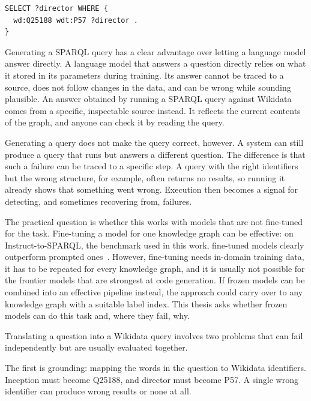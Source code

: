 \begin{lstlisting}[language=SPARQL,caption={A SPARQL query for ``Who directed Inception?''. It returns wd:Q25191 (Christopher Nolan).},label={lst:example-query},captionpos=b]
SELECT ?director WHERE {
  wd:Q25188 wdt:P57 ?director .
}
\end{lstlisting}

Generating a SPARQL query has a clear advantage over letting a language model answer directly.
A language model that answers a question directly relies on what it stored in its parameters during training.
Its answer cannot be traced to a source, does not follow changes in the data, and can be wrong while sounding plausible.
An answer obtained by running a SPARQL query against Wikidata comes from a specific, inspectable source instead.
It reflects the current contents of the graph, and anyone can check it by reading the query.

Generating a query does not make the query correct, however.
A system can still produce a query that runs but answers a different question.
The difference is that such a failure can be traced to a specific step.
A query with the right identifiers but the wrong structure, for example, often returns no results, so running it already shows that something went wrong.
Execution then becomes a signal for detecting, and sometimes recovering from, failures.

The practical question is whether this works with models that are not fine-tuned for the task.
Fine-tuning a model for one knowledge graph can be effective: on Instruct-to-SPARQL, the benchmark used in this work, fine-tuned models clearly outperform prompted ones~\citep{benamor2025instruct}.
However, fine-tuning needs in-domain training data, it has to be repeated for every knowledge graph, and it is usually not possible for the frontier models that are strongest at code generation.
If frozen models can be combined into an effective pipeline instead, the approach could carry over to any knowledge graph with a suitable label index.
This thesis asks whether frozen models can do this task and, where they fail, why.

Translating a question into a Wikidata query involves two problems that can fail independently but are usually evaluated together.

The first is grounding: mapping the words in the question to Wikidata identifiers.
Inception must become Q25188, and director must become P57.
A single wrong identifier can produce wrong results or none at all.


